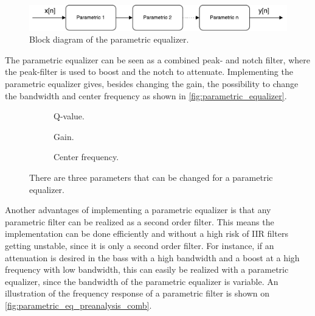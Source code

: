 \begin{figure}[H]
\centering
\includegraphics[width=0.8 \textwidth]{figures/parametric_eq.pdf}
\caption{Block diagram of the parametric equalizer.}
\label{fig:parametric_eq}
\end{figure}

The parametric equalizer can be seen as a combined peak- and notch filter, where the peak-filter is used to boost and the notch to attenuate. Implementing the parametric equalizer gives, besides changing the gain, the possibility to change the bandwidth and center frequency as shown in \autoref{fig:parametric_equalizer}.

\begin{figure}[H]
\centering
\hspace*{-1cm}
\begin{subfigure}[t]{0.3\textwidth}
	
	\caption{Q-value.}
	\label{fig:parametric_q}
\end{subfigure}
\hspace{2mm} 
\begin{subfigure}[t]{0.3\textwidth}
	
	\caption{Gain.}
	\label{fig:parametric_db}
\end{subfigure}
\hspace{2mm}
\begin{subfigure}[t]{0.3\textwidth}
	
	\caption{Center frequency.}
	\label{fig:parametric_fc}
\end{subfigure}
\caption{There are three parameters that can be changed for a parametric equalizer.}
\label{fig:parametric_equalizer}
\end{figure}

Another advantages of implementing a parametric equalizer is that any parametric filter can be realized as a second order filter. This means the implementation can be done efficiently and without a high risk of IIR filters getting unstable, since it is only a second order filter. For instance, if an attenuation is desired in the bass with a high bandwidth and a boost at a high frequency with low bandwidth, this can easily be realized with a parametric equalizer, since the bandwidth of the parametric equalizer is variable. An illustration of the frequency response of a parametric filter is shown on \autoref{fig:parametric_eq_preanalysis_comb}.

